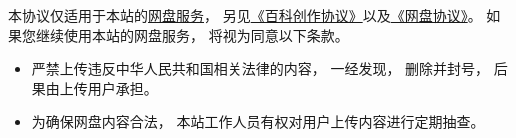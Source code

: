 
本协议仅适用于本站的\href{http://example.com}{网盘服务}， 另见\href{https://wuli.wiki/online/licens.html}{《百科创作协议》}以及\href{http://www.example.com}{《网盘协议》}。 如果您继续使用本站的网盘服务， 将视为同意以下条款。

\begin{itemize}
\item 严禁上传违反中华人民共和国相关法律的内容， 一经发现， 删除并封号， 后果由上传用户承担。
\item 为确保网盘内容合法， 本站工作人员有权对用户上传内容进行定期抽查。
\end{itemize}

